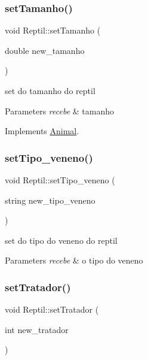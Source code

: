 \mbox{\label{class_reptil_a3ce16647fa672d44d89f60e9d507b522}} 
\subsubsection{\texorpdfstring{setTamanho()}{setTamanho()}}
{\footnotesize\ttfamily void Reptil\+::set\+Tamanho (\begin{DoxyParamCaption}\item[{double}]{new\+\_\+tamanho }\end{DoxyParamCaption})\hspace{0.3cm}{\ttfamily [virtual]}}



set do tamanho do reptil 


\begin{DoxyParams}{Parameters}
{\em recebe} & tamanho \\
\hline
\end{DoxyParams}


Implements \mbox{\hyperlink{class_animal}{Animal}}.

\mbox{\label{class_reptil_a4ee801df6442082d813b37e2ad6f65fa}} 
\subsubsection{\texorpdfstring{setTipo\_veneno()}{setTipo\_veneno()}}
{\footnotesize\ttfamily void Reptil\+::set\+Tipo\+\_\+veneno (\begin{DoxyParamCaption}\item[{string}]{new\+\_\+tipo\+\_\+veneno }\end{DoxyParamCaption})}



set do tipo do veneno do reptil 


\begin{DoxyParams}{Parameters}
{\em recebe} & o tipo do veneno \\
\hline
\end{DoxyParams}
\mbox{\label{class_reptil_a1b3fa02316b7b5e780539bbb4cff773e}} 
\subsubsection{\texorpdfstring{setTratador()}{setTratador()}}
{\footnotesize\ttfamily void Reptil\+::set\+Tratador (\begin{DoxyParamCaption}\item[{int}]{new\+\_\+tratador }\end{DoxyParamCaption})\hspace{0.3cm}{\ttfamily [virtual]}}



